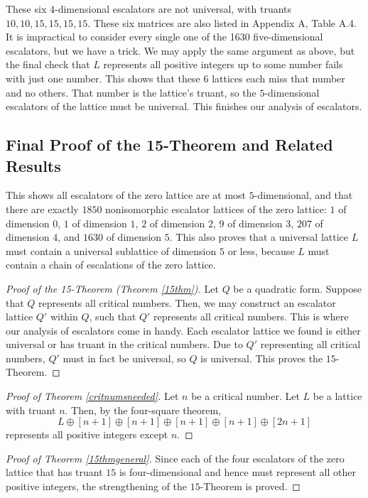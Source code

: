 \documentclass[letterpaper, 12pt]{article}
\begin{document}
These six $4$-dimensional escalators are not universal, with truants $10,10,15,15,15,15$. These six matrices are also listed in Appendix A, Table A.4. It is impractical to consider every single one of the 1630 five-dimensional escalators, but we have a trick. We may apply the same argument as above, but the final check that $L$ represents all positive integers up to some number fails with just one number. This shows that these $6$ lattices each miss that number and no others. That number is the lattice's truant, so the $5$-dimensional escalators of the lattice must be universal. This finishes our analysis of escalators.

\subsection{Final Proof of the 15-Theorem and Related Results}
This shows all escalators of the zero lattice are at most $5$-dimensional, and that there are exactly $1850$ nonisomorphic escalator lattices of the zero lattice: $1$ of dimension $0$, $1$ of dimension $1$, $2$ of dimension $2$, $9$ of dimension $3$, $207$ of dimension $4$, and $1630$ of dimension $5$. This also proves that a universal lattice $L$ must contain a universal sublattice of dimension $5$ or less, because $L$ must contain a chain of escalations of the zero lattice.

\begin{proof}[Proof of the 15-Theorem (Theorem \ref{15thm})]
    Let $Q$ be a quadratic form. Suppose that $Q$ represents all critical numbers. Then, we may construct an escalator lattice $Q'$ within $Q$, such that $Q'$ represents all critical numbers. This is where our analysis of escalators come in handy.
    Each escalator lattice we found is either universal or has truant in the critical numbers. Due to $Q'$ representing all critical numbers, $Q'$ must in fact be universal, so $Q$ is universal. This proves the $15$-Theorem.
\end{proof}
\begin{proof}[Proof of Theorem \ref{critnumsneeded}]
    Let $n$ be a critical number. Let $L$ be a lattice with truant $n$. Then, by the four-square theorem,
    \[L \oplus [n + 1] \oplus [n + 1] \oplus [n + 1] \oplus [n + 1] \oplus [2n + 1]\]
    represents all positive integers except $n$.
\end{proof}
\begin{proof}[Proof of Theorem \ref{15thmgeneral}]
    Since each of the four escalators of the zero lattice that has truant $15$ is four-dimensional and hence must represent all other positive integers, the strengthening of the $15$-Theorem is proved.
\end{proof}
\end{document}

